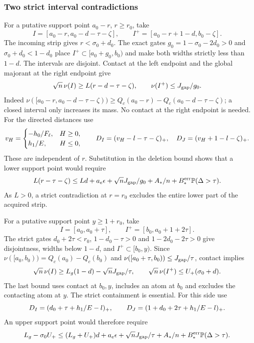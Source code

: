 \subsubsection{Two strict interval contradictions}
\label{v9:confinement:intervals}
For a putative support point $a_0-r$, $r\ge r_0$, take
\[
 I=[a_0-r,a_0-d-\tau-\zeta],\qquad
 I^+=[a_0-r+1-d,b_0-\zeta].
\]
The incoming strip gives $r<\sigma_0+d_0$. The exact gates
$g_0=1-\sigma_0-2d_0>0$ and $\sigma_0+d_0<1-d_0$ place
$I^+\subset[a_0+g_0,b_0)$ and make both widths strictly less than $1-d$.
The intervals are disjoint. Contact at the left endpoint and the
global majorant at the right endpoint give
\[
 \sqrt n\,\nu(I)\ge L(r-d-\tau-\zeta),\qquad
 \nu(I^+)\le J_{\rm gap}/g_0.
\]
Indeed
$\nu([a_0-r,a_0-d-\tau-\zeta))\ge
Q_c(a_0-r)-Q_c(a_0-d-\tau-\zeta)$; a closed interval only increases
its mass. No contact at the right endpoint is needed.
For the directed distances use
\[
 v_H=\begin{cases}-h_0/F_\ell,&H\ge0,\\h_1/E,&H\le0,\end{cases}\qquad
 D_I=(v_H-l-\tau-\zeta)_+,\quad D_J=(v_H+1-l-\zeta)_+.
\]
These are independent of $r$. Substitution in the deletion bound shows
that a lower support point would require
\begin{equation}\label{v9:confinement:lower-necessary}
 L(r-\tau-\zeta)\le Ld+a_e\epsilon+\sqrt nJ_{\rm gap}/g_0+
                     A_*/n+B_*^{\rm err}\mathbb P(\Delta>\tau).
\end{equation}
As $L>0$, a strict contradiction at $r=r_0$ excludes the entire lower
part of the acquired strip.

For a putative support point $y\ge1+r_0$, take
\[
 I=[a_0,a_0+\tau],\qquad I^+=[b_0,a_0+1+2\tau].
\]
The strict gates $d_0+2\tau<r_0$, $1-d_0-\tau>0$ and
$1-2d_0-2\tau>0$ give disjointness, widths below $1-d$, and
$I^+\subset[b_0,y)$. Since
$\nu([a_0,b_0))=Q_c(a_0)-Q_c(b_0)$ and
$\nu([a_0+\tau,b_0))\le J_{\rm gap}/\tau$, contact implies
\[
 \sqrt n\,\nu(I)\ge L_g(1-d)-\sqrt nJ_{\rm gap}/\tau,\qquad
 \sqrt n\,\nu(I^+)\le U_+(\sigma_0+d).
\]
The last bound uses contact at $b_0,y$, includes an atom at $b_0$ and
excludes the contacting atom at $y$. The strict containment is essential.
For this side use
\[
 D_I=(d_0+\tau+h_1/E-l)_+,\qquad
 D_J=(1+d_0+2\tau+h_1/E-l)_+.
\]
An upper support point would therefore require
\begin{equation}\label{v9:confinement:upper-necessary}
 L_g-\sigma_0U_+\le(L_g+U_+)d+a_e\epsilon+
            \sqrt nJ_{\rm gap}/\tau+A_*/n+B_*^{\rm err}\mathbb P(\Delta>\tau).
\end{equation}

